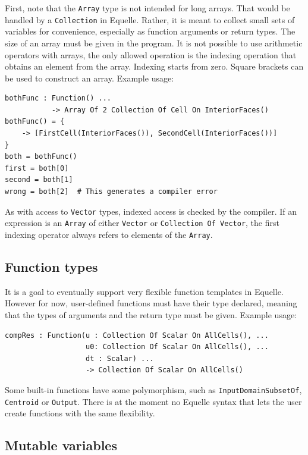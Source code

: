 \documentclass[11pt]{article}
\newcommand{\code}[1]{\texttt{#1}}
\begin{document}
First, note that the \code{Array} type is not intended for long arrays. That would be
handled by a \code{Collection} in Equelle. Rather, it is meant to collect small sets of
variables for convenience, especially as function arguments or return types. The size of
an array must be given in the program. It is not possible to use arithmetic operators with
arrays, the only allowed operation is the indexing operation that obtains an element from
the array. Indexing starts from zero. Square brackets can be used to construct an
array. Example usage:
\begin{verbatim}
bothFunc : Function() ...
           -> Array Of 2 Collection Of Cell On InteriorFaces()
bothFunc() = {
    -> [FirstCell(InteriorFaces()), SecondCell(InteriorFaces())]
}
both = bothFunc()
first = both[0]
second = both[1]
wrong = both[2]  # This generates a compiler error
\end{verbatim}

As with access to \code{Vector} types, indexed access is checked by the compiler. If an
expression is an \code{Array} of either \code{Vector} or \code{Collection Of Vector}, the
first indexing operator always refers to elements of the \code{Array}.

\subsection{Function types}\label{sec:functypes}

It is a goal to eventually support very flexible function templates in Equelle. However
for now, user-defined functions must have their type declared, meaning that the types of
arguments and the return type must be given. Example usage:

\begin{verbatim}
compRes : Function(u : Collection Of Scalar On AllCells(), ...
                   u0: Collection Of Scalar On AllCells(), ...
                   dt : Scalar) ...
                   -> Collection Of Scalar On AllCells()
\end{verbatim}

Some built-in functions have some polymorphism, such as \code{InputDomainSubsetOf},
\code{Centroid} or \code{Output}. There is at the moment no Equelle syntax that lets the
user create functions with the same flexibility.

\subsection{Mutable variables}
\end{document}
